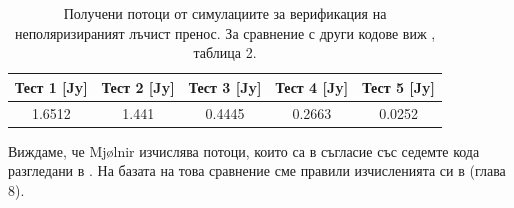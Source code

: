 \begin{appendices}
\begin{table}[h!]
	\centering
	\begin{tabular}{c|c|c|c|c}
		\hline
		{Тест 1 [Jy]} & {Тест 2 [Jy]} & {Тест 3 [Jy]} & {Тест 4 [Jy]} & {Тест 5 [Jy]}
		\\\hline\hline
		1.6512 & 1.441 & 0.4445 & 0.2663 & 0.0252
		\\\hline\hline
	\end{tabular}
	\caption[Получени потоци от симулациите за верификация на неполяризираният лъчист пренос.]{\small Получени потоци от симулациите за верификация на неполяризираният лъчист пренос. За сравнение с други кодове виж \cite{Gold2020}, таблица 2.}
	\label{table:Sim_Verification_flux}
\end{table}
Виждаме, че Mjølnir изчислява потоци, които са в съгласие със седемте кода разгледани в \cite{Gold2020}. На базата на това сравнение сме правили изчисленията си в \cite{Deliyski2024} (глава 8).

\end{appendices}
